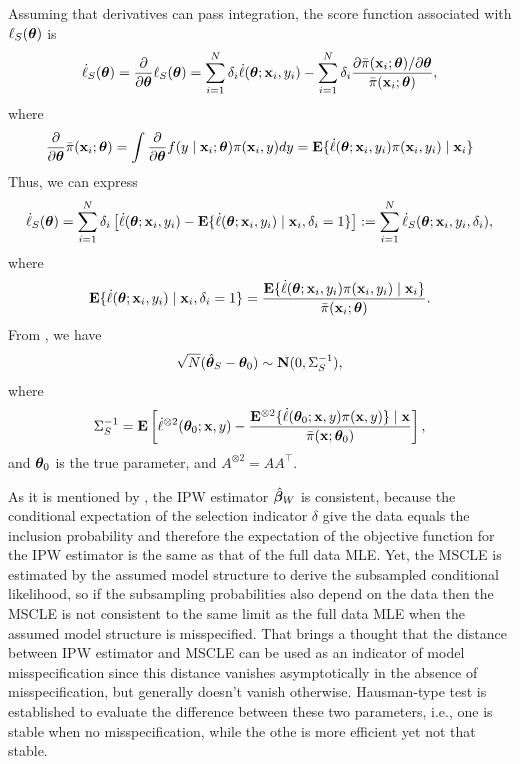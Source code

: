 \documentclass[12pt,hidelinks]{article}
\begin{document}
Assuming that derivatives can pass integration, the score function associated with $\ell_S(\bm{\theta})$ is
\begin{align}
    \dot \ell_S(\bm{\theta}) = \frac{\partial}{\partial \bm{\theta}} \ell_S(\bm{\theta}) = \sum_{i=1}^{N} \delta_i \dot \ell(\bm{\theta}; \mathbf{x}_i, y_i) - \sum_{i=1}^{N} \delta_i \frac{\partial \bar{\pi}(\mathbf{x}_i; \bm{\theta}) / \partial \bm{\theta}}{\bar{\pi}(\mathbf{x}_i; \bm{\theta})},
\end{align}
where
\begin{align}
    \frac{\partial}{\partial \bm{\theta}} \bar{\pi}(\mathbf{x}_i; \bm{\theta}) = \int \frac{\partial}{\partial \bm{\theta}} f(y \mid \mathbf{x}_i; \bm{\theta}) \pi(\mathbf{x}_i, y)   dy = \mathbf{E}\{\dot \ell(\bm{\theta}; \mathbf{x}_i, y_i) \pi(\mathbf{x}_i, y_i) \mid \mathbf{x}_i\}
\end{align}
Thus, we can express
\begin{align}\label{psi_S}
    \dot \ell_S(\bm{\theta}) = \sum_{i=1}^{N} \delta_i \left[ \dot \ell(\bm{\theta}; \mathbf{x}_i, y_i) - \mathbf{E}\{\dot \ell(\bm{\theta}; \mathbf{x}_i, y_i) \mid \mathbf{x}_i, \delta_i = 1\} \right] := \sum_{i=1}^{N} \dot \ell_S(\bm{\theta}; \mathbf{x}_i, y_i, \delta_i),
\end{align}
where
\begin{equation*}
    \mathbf{E}\{\dot \ell(\bm{\theta}; \mathbf{x}_i, y_i) \mid \mathbf{x}_i, \delta_i = 1\} = \frac{\mathbf{E}\{\dot \ell(\bm{\theta}; \mathbf{x}_i, y_i) \pi(\mathbf{x}_i, y_i) \mid \mathbf{x}_i\}}{\bar{\pi}(\mathbf{x}_i; \bm{\theta})}.
\end{equation*}
From \citet{wang2022maximum}, we have 
\begin{align}
    \sqrt{N} ({\hat{\bm{\theta}}}_S - \bm{\theta}_0) \sim \mathbf{N}(0, \Sigma_S^{-1}),
\end{align}
where 
\begin{align}
    \Sigma_S^{-1} = \mathbf{E} \left[\dot \ell^{\otimes 2}(\bm{\theta}_0; \mathbf{x}, y) - \frac{\mathbf{E}^{\otimes 2}\{\dot \ell (\bm{\theta}_0; \mathbf{x}, y) \pi(\mathbf{x}, y)\}\mid \mathbf{x}}{\bar{\pi}(\mathbf{x}; \bm{\theta}_0)} \right],
\end{align}
and $\bm{\theta}_0$ is the true parameter, and $A^{\otimes 2} = AA^\top$.

As it is mentioned by \cite{wang2022maximum}, the IPW estimator $\hat{\bm{\beta}}_W$ is
consistent, because the conditional expectation of the selection indicator $\delta$ give the data equals the inclusion probability and therefore the expectation of the objective function for the IPW estimator is the same as that of the full data MLE.
Yet, the MSCLE is estimated by the assumed model structure to derive the subsampled conditional likelihood, 
so if the subsampling probabilities also depend on the data then the MSCLE is not consistent to the same limit as the full data MLE when the assumed model structure is misspecified. 
That brings a thought that the distance between IPW estimator and MSCLE can be used as an indicator of model misspecification since this distance vanishes asymptotically in the absence of misspecification, but generally doesn't vanish otherwise.
Hausman-type test \cite{hausman1978specification, white1982maximum} is established to evaluate the difference between these two parameters, i.e., one is stable when no misspecification, while the othe is more efficient yet not that stable.
\end{document}
